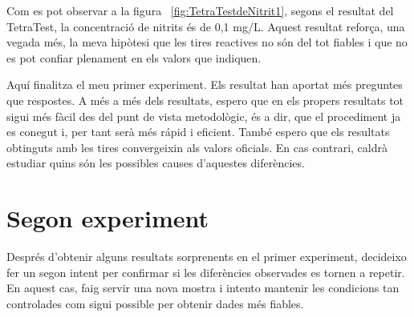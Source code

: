 Com es pot observar a la figura~ \ref{fig:TetraTestdeNitrit1}, segons el resultat del TetraTest, la concentració de nitrits és de 0,1 mg/L. Aquest resultat reforça, una vegada més, la meva hipòtesi que les tires reactives no són del tot fiables i que no es pot confiar plenament en els valors que indiquen.

Aquí finalitza el meu primer experiment. Els resultat han aportat més preguntes que respostes. A més a més dels resultats, espero que en els propers resultats tot sigui més fàcil des del punt de vista metodològic, és a dir, que el procediment ja es conegut i, per tant serà més rápid i eficient. També espero que els resultats obtinguts amb les tires convergeixin als valors oficials. En cas contrari, caldrà estudiar quins són les possibles causes d'aquestes diferències.


\clearpage

\section{Segon experiment}


Després d’obtenir alguns resultats sorprenents en el primer experiment, decideixo fer un segon intent per confirmar si les diferències observades es tornen a repetir. En aquest cas, faig servir una nova mostra i intento mantenir les condicions tan controlades com sigui possible per obtenir dades més fiables.

